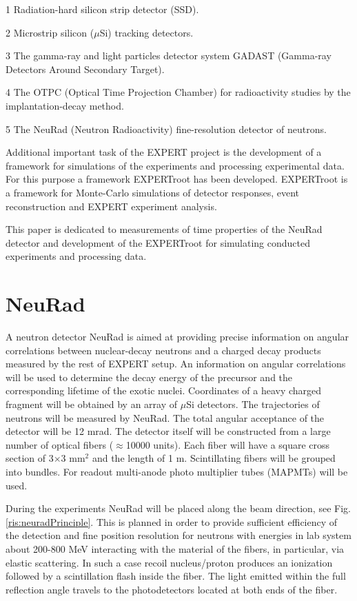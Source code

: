 \documentclass{webofc}
\begin{document}
\begin{inparadesc}
	\item[1] Radiation-hard silicon strip detector (SSD).
	\item[2] Microstrip silicon ($\mu$Si) tracking detectors.
	\item[3] The gamma-ray and light particles detector system GADAST (Gamma-ray Detectors Around Secondary Target).
	\item[4]  The OTPC (Optical Time Projection Chamber) for radioactivity studies by the implantation-decay method.
	\item[5]	The NeuRad (Neutron Radioactivity) fine-resolution detector of neutrons.
\end{inparadesc}

Additional important task of the EXPERT project is the development of a framework for simulations of the experiments and processing experimental data. For this purpose a framework EXPERTroot \cite{er} has been developed. EXPERTroot is a framework for Monte-Carlo simulations of detector responses, event reconstruction and EXPERT experiment analysis.

This paper is dedicated to measurements of time properties of the NeuRad detector and development of the EXPERTroot for simulating conducted experiments and processing data.

\section{NeuRad}
A neutron detector NeuRad is aimed at providing precise information on angular correlations between nuclear-decay neutrons and a charged decay products measured by the rest of EXPERT setup. An information on angular correlations will be used to determine the decay energy of the precursor and the corresponding lifetime of the exotic nuclei. Coordinates of a heavy charged fragment will be obtained by an array of $\mu$Si detectors. The trajectories of neutrons will be measured by NeuRad. The total angular acceptance of the detector will be 12 mrad. %
The detector itself will be constructed from a large number of optical fibers ($\approx$10000 units). Each fiber will have a square cross section of 3$\times$3 mm$^2$ and the length of 1 m. Scintillating fibers will be grouped into bundles. For readout multi-anode photo multiplier tubes (MAPMTs) will be used. 

During the experiments NeuRad will be placed along the beam direction, see Fig.\ref{ris:neuradPrinciple}. This is planned in order to provide sufficient efficiency of the detection and fine position resolution for neutrons with energies in lab system about 200-800 MeV interacting with the material of the fibers, in particular, via elastic scattering. In such a case recoil nucleus/proton produces an ionization followed by a scintillation flash inside the fiber. The light emitted within the full reflection angle travels to the photodetectors located at both ends of the fiber.
\end{document}
